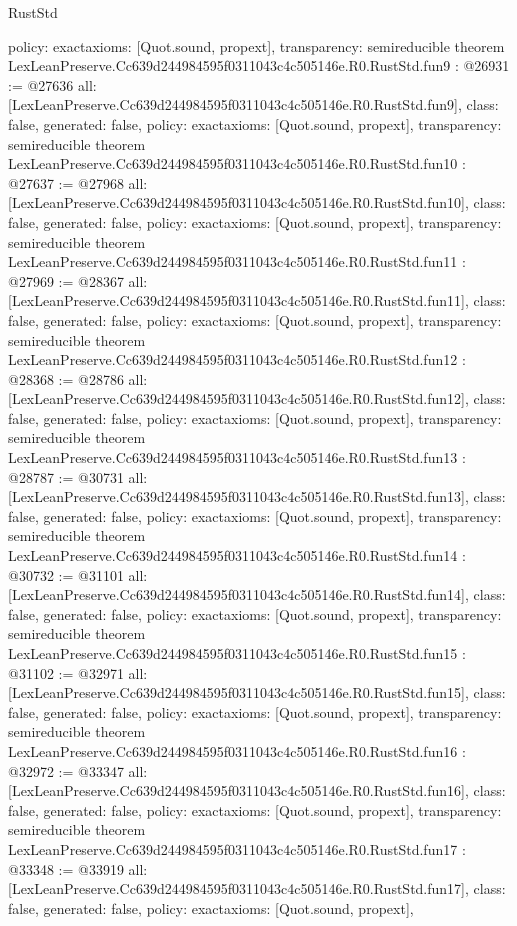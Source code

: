 \begin{lexlean}{RustStd}
\begin{coremodule}
{  policy: exact{axioms: [Quot.sound, propext]},
  transparency: semireducible
}
theorem LexLeanPreserve.Cc639d244984595f0311043c4c505146e.R0.RustStd.fun9 : @26931 := @27636 {
  all: [LexLeanPreserve.Cc639d244984595f0311043c4c505146e.R0.RustStd.fun9],
  class: false,
  generated: false,
  policy: exact{axioms: [Quot.sound, propext]},
  transparency: semireducible
}
theorem LexLeanPreserve.Cc639d244984595f0311043c4c505146e.R0.RustStd.fun10 : @27637 := @27968 {
  all: [LexLeanPreserve.Cc639d244984595f0311043c4c505146e.R0.RustStd.fun10],
  class: false,
  generated: false,
  policy: exact{axioms: [Quot.sound, propext]},
  transparency: semireducible
}
theorem LexLeanPreserve.Cc639d244984595f0311043c4c505146e.R0.RustStd.fun11 : @27969 := @28367 {
  all: [LexLeanPreserve.Cc639d244984595f0311043c4c505146e.R0.RustStd.fun11],
  class: false,
  generated: false,
  policy: exact{axioms: [Quot.sound, propext]},
  transparency: semireducible
}
theorem LexLeanPreserve.Cc639d244984595f0311043c4c505146e.R0.RustStd.fun12 : @28368 := @28786 {
  all: [LexLeanPreserve.Cc639d244984595f0311043c4c505146e.R0.RustStd.fun12],
  class: false,
  generated: false,
  policy: exact{axioms: [Quot.sound, propext]},
  transparency: semireducible
}
theorem LexLeanPreserve.Cc639d244984595f0311043c4c505146e.R0.RustStd.fun13 : @28787 := @30731 {
  all: [LexLeanPreserve.Cc639d244984595f0311043c4c505146e.R0.RustStd.fun13],
  class: false,
  generated: false,
  policy: exact{axioms: [Quot.sound, propext]},
  transparency: semireducible
}
theorem LexLeanPreserve.Cc639d244984595f0311043c4c505146e.R0.RustStd.fun14 : @30732 := @31101 {
  all: [LexLeanPreserve.Cc639d244984595f0311043c4c505146e.R0.RustStd.fun14],
  class: false,
  generated: false,
  policy: exact{axioms: [Quot.sound, propext]},
  transparency: semireducible
}
theorem LexLeanPreserve.Cc639d244984595f0311043c4c505146e.R0.RustStd.fun15 : @31102 := @32971 {
  all: [LexLeanPreserve.Cc639d244984595f0311043c4c505146e.R0.RustStd.fun15],
  class: false,
  generated: false,
  policy: exact{axioms: [Quot.sound, propext]},
  transparency: semireducible
}
theorem LexLeanPreserve.Cc639d244984595f0311043c4c505146e.R0.RustStd.fun16 : @32972 := @33347 {
  all: [LexLeanPreserve.Cc639d244984595f0311043c4c505146e.R0.RustStd.fun16],
  class: false,
  generated: false,
  policy: exact{axioms: [Quot.sound, propext]},
  transparency: semireducible
}
theorem LexLeanPreserve.Cc639d244984595f0311043c4c505146e.R0.RustStd.fun17 : @33348 := @33919 {
  all: [LexLeanPreserve.Cc639d244984595f0311043c4c505146e.R0.RustStd.fun17],
  class: false,
  generated: false,
  policy: exact{axioms: [Quot.sound, propext]},
}
\end{coremodule}
\end{lexlean}
